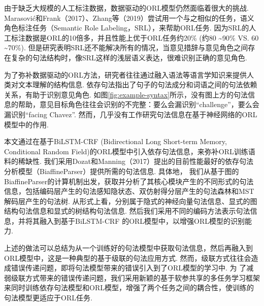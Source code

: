 由于缺乏大规模的人工标注数据，数据驱动的ORL模型仍然面临着很大的挑战. Marasovi{\'c}和Frank（2017）、Zhang等（2019）尝试用一个与之相似的任务，语义角色标注任务（Semantic Role Labeling，SRL），来帮助ORL任务. 因为SRL的人工标注数据是ORL的10倍多，并且性能上优于ORL任务约20\% (约80 \textasciitilde 90\% VS. 60 \textasciitilde 70\%). 但是研究表明SRL还不能解决所有的情况，当意见措辞与意见角色之间存在复杂的句法结构时，像SRL这样的浅层语义表达，很难识别正确的意见角色.

为了弥补数据驱动的ORL方法，研究者往往通过融入语法等语言学知识来提供人类对文本理解的结构信息. 依存句法指出了句子的句法成分和词语之间的句法依赖关系，有助于识别意见角色. 如图\ref{fig:example-syntax}所示，没有图上方的句法信息的帮助，意见目标角色往往会识别的不完整：要么会漏识别“challenge”，要么会漏识别“facing Chavez”.
然而，几乎没有工作研究句法信息在基于神经网络的ORL模型中的作用.

本文通过在基于BiLSTM-CRF (Bidirectional Long Short-term Memory, Conditional Random Field)的ORL模型中引入依存句法信息，来弥补ORL训练语料的稀缺性.
我们采用Dozat和Manning（2017）提出的目前性能最好的依存句法分析模型（BiaffineParser）提供所需的句法信息. 具体地，
我们从基于图的BiaffineParser的计算机制出发，获取并分析了其核心模块产生的不同形式的句法信息，包括编码层产生的句法感知隐状态、双仿射得分层产生的句法森林和MST解码层产生的句法树.
从形式上看，分别属于隐式的神经向量句法信息、显式的图结构句法信息和显式的树结构句法信息.
然后我们采用不同的编码方法表示句法信息，并将其融入到基于BiLSTM-CRF 的ORL模型中，以增强ORL模型的识别能力.

上述的做法可以总结为从一个训练好的句法模型中获取句法信息，然后再融入到ORL模型中，这是一种典型的基于级联的句法应用方式.
然而，级联方式往往会造成错误传递问题，即将句法模型带来的错误引入到了ORL模型的学习中. 为
了减弱级联方式带来的错误传递问题，我们采用新颖的基于软参共享的多任务学习框架来同时训练依存句法模型和ORL模型，增强了两个任务之间的耦合性，使训练的句法模型更适应于ORL任务.

